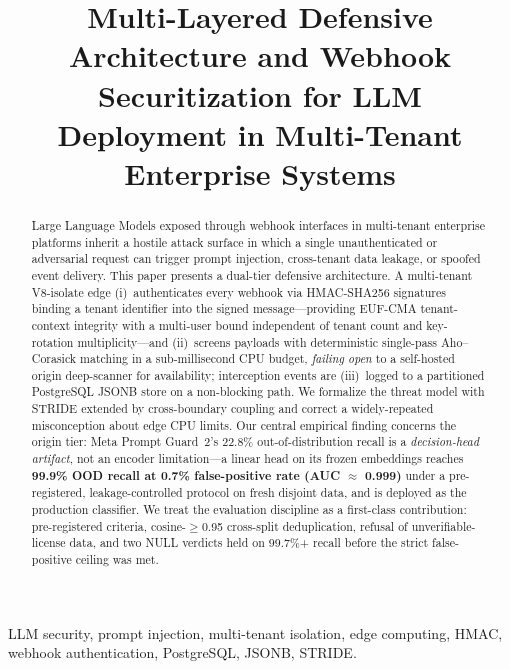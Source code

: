 \documentclass[conference]{IEEEtran}
\begin{document}
\title{Multi-Layered Defensive Architecture and Webhook Securitization for LLM
Deployment in Multi-Tenant Enterprise Systems}

\author{
}

\maketitle

\begin{abstract}
Large Language Models exposed through webhook interfaces in multi-tenant enterprise
platforms inherit a hostile attack surface in which a single unauthenticated or
adversarial request can trigger prompt injection, cross-tenant data leakage, or
spoofed event delivery. This paper presents a dual-tier defensive architecture. A
multi-tenant V8-isolate edge (i)~authenticates every webhook via HMAC-SHA256 signatures
binding a tenant identifier into the signed message---providing EUF-CMA tenant-context
integrity with a multi-user bound independent of tenant count and key-rotation
multiplicity---and (ii)~screens payloads with deterministic single-pass Aho--Corasick
matching in a sub-millisecond CPU budget, \emph{failing open} to a self-hosted origin
deep-scanner for availability; interception events are (iii)~logged to a partitioned
PostgreSQL JSONB store on a non-blocking path. We formalize the threat model with STRIDE
extended by cross-boundary coupling and correct a widely-repeated misconception about
edge CPU limits. Our central empirical finding concerns the origin tier: Meta Prompt
Guard~2's 22.8\% out-of-distribution recall is a \emph{decision-head artifact}, not an
encoder limitation---a linear head on its frozen embeddings reaches \textbf{99.9\% OOD
recall at 0.7\% false-positive rate (AUC $\approx$ 0.999)} under a pre-registered,
leakage-controlled protocol on fresh disjoint data, and is deployed as the production
classifier. We treat the evaluation discipline as a first-class contribution:
pre-registered criteria, cosine-$\ge$0.95 cross-split deduplication, refusal of
unverifiable-license data, and two NULL verdicts held on 99.7\%+ recall before the
strict false-positive ceiling was met.
\end{abstract}

\begin{IEEEkeywords}
LLM security, prompt injection, multi-tenant isolation, edge computing, HMAC,
webhook authentication, PostgreSQL, JSONB, STRIDE.
\end{IEEEkeywords}



% 
% 
\end{document}
